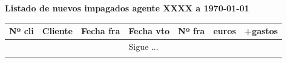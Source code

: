 \documentclass[a4paper]{article}
\begin{document}
\begin{center}
\textbf{Listado de nuevos impagados agente XXXX a {\today}}
\small
\begin{longtable}{llcccrr}
\toprule
\textbf{Nº cli} & \textbf{Cliente}&\textbf{Fecha fra}&\textbf{Fecha vto}&\textbf{Nº fra}&\textbf{euros}&\textbf{+gastos}\\
\toprule
\endhead
\multicolumn{7}{c}{Sigue $\ldots$}\\
\endfoot
\endlastfoot

\bottomrule
\end{longtable}
\end{center}
\end{document}
